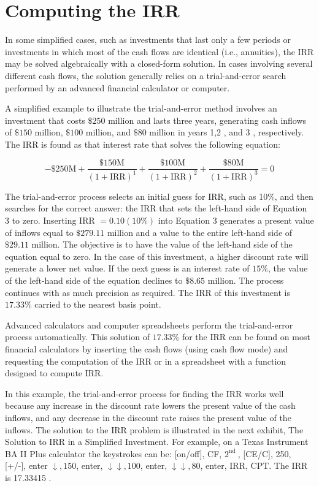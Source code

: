 \documentclass[11pt]{article}
\begin{document}
\section*{Computing the IRR}
In some simplified cases, such as investments that last only a few periods or investments in which most of the cash flows are identical (i.e., annuities), the IRR may be solved algebraically with a closed-form solution. In cases involving several different cash flows, the solution generally relies on a trial-and-error search performed by an advanced financial calculator or computer.

A simplified example to illustrate the trial-and-error method involves an investment that costs $\$ 250$ million and lasts three years, generating cash inflows of $\$ 150$ million, $\$ 100$ million, and $\$ 80$ million in years 1,2 , and 3 , respectively. The IRR is found as that interest rate that solves the following equation:


\begin{equation*}
-\$ 250 \mathrm{M}+\frac{\$ 150 \mathrm{M}}{(1+\mathrm{IRR})^{1}}+\frac{\$ 100 \mathrm{M}}{(1+\mathrm{IRR})^{2}}+\frac{\$ 80 \mathrm{M}}{(1+\mathrm{IRR})^{3}}=0 \tag{3}
\end{equation*}


The trial-and-error process selects an initial guess for IRR, such as 10\%, and then searches for the correct answer: the IRR that sets the left-hand side of Equation 3 to zero. Inserting IRR $=0.10(10 \%)$ into Equation 3 generates a present value of inflows equal to $\$ 279.11$ million and a value to the entire left-hand side of $\$ 29.11$ million. The objective is to have the value of the left-hand side of the equation equal to zero. In the case of this investment, a higher discount rate will generate a lower net value. If the next guess is an interest rate of $15 \%$, the value of the left-hand side of the equation declines to $\$ 8.65$ million. The process continues with as much precision as required. The IRR of this investment is $17.33 \%$ carried to the nearest basis point.

Advanced calculators and computer spreadsheets perform the trial-and-error process automatically. This solution of $17.33 \%$ for the IRR can be found on most financial calculators by inserting the cash flows (using cash flow mode) and requesting the computation of the IRR or in a spreadsheet with a function designed to compute IRR.

In this example, the trial-and-error process for finding the IRR works well because any increase in the discount rate lowers the present value of the cash inflows, and any decrease in the discount rate raises the present value of the inflows. The solution to the IRR problem is illustrated in the next exhibit, The Solution to IRR in a Simplified Investment. For example, on a Texas Instrument BA II Plus calculator the keystrokes can be: [on/off], CF, $2^{\text {nd }}$, [CE/C], 250, [+/-], enter $\downarrow, 150$, enter, $\downarrow \downarrow, 100$, enter, $\downarrow \downarrow, 80$, enter, IRR, CPT. The IRR is 17.33415 .
\end{document}

